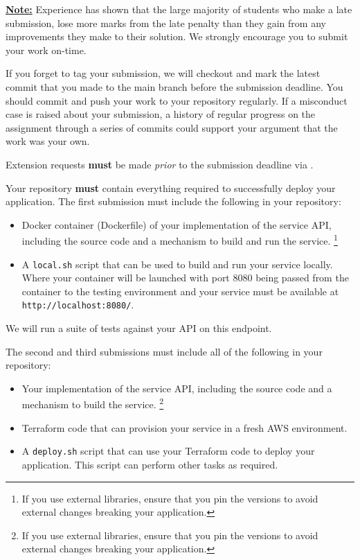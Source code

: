 \documentclass{csse4400}
\begin{document}
\textbf{\underline{Note:}} Experience has shown that the large majority of students who make a late submission,
lose more marks from the late penalty than they gain from any improvements they make to their solution.
We strongly encourage you to submit your work on-time.

If you forget to tag your submission, we will checkout and mark the latest commit that you made to the main branch before the submission deadline.
You should commit and push your work to your repository regularly.
If a misconduct case is raised about your submission, a history of regular progress on the assignment through a series of commits could support your argument that the work was your own.

Extension requests \textbf{must} be made \emph{prior} to the submission deadline via .

Your repository \textbf{must} contain everything required to successfully deploy your application.
The first submission must include the following in your repository:
\begin{itemize}
  \item Docker container (Dockerfile) of your implementation of the service API, including the source code and a mechanism to build and run the service.%
  \footnote{If you use external libraries, ensure that you pin the versions to avoid external changes breaking your application.}
  \item A \texttt{local.sh} script that can be used to build and run your service locally. Where your container will be launched with port 8080 being passed from the container to the testing environment and your service must be available at \texttt{http://localhost:8080/}.
\end{itemize}
We will run a suite of tests against your API on this endpoint.

\begin{samepage}
\noindent
The second and third submissions must include all of the following in your repository:
\begin{itemize}
  \item Your implementation of the service API, including the source code and a mechanism to build the service.%
  \footnote{If you use external libraries, ensure that you pin the versions to avoid external changes breaking your application.}
  \item Terraform code that can provision your service in a fresh AWS environment.
  \item A \texttt{deploy.sh} script that can use your Terraform code to deploy your application.
    This script can perform other tasks as required.
\end{itemize}
\end{samepage}
\end{document}
